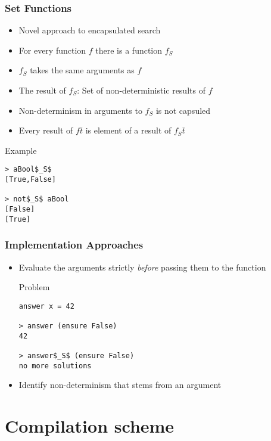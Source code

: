 \documentclass[utf8]{beamer}
\begin{document}
\begin{frame}[fragile]
\frametitle{Set Functions}
\begin{itemize}
\item Novel approach to encapsulated search
\item For every function $f$ there is a function $f_S$
\item $f_S$ takes the same arguments as $f$
\item The result of $f_S$: Set of non-deterministic results of $f$
\item Non-determinism in arguments to $f_S$ is not capsuled
\item Every result of $f \overline{t}$ is element of a
      result of $f_S \overline{t}$
\end{itemize}
\begin{block}{Example}
\begin{lstlisting}[mathescape]
> aBool$_S$ 
[True,False]

> not$_S$ aBool
[False]
[True]
\end{lstlisting}
\end{block} 
\end{frame}

\begin{frame}[fragile]
\frametitle{Implementation Approaches}
\begin{itemize}
\item Evaluate the arguments strictly \emph{before}
      passing them to the function
\pause
\begin{block}{Problem}
\begin{lstlisting}[mathescape]
answer x = 42

> answer (ensure False)
42

> answer$_S$ (ensure False)
no more solutions
\end{lstlisting}
\end{block}
\item Identify non-determinism that stems from an argument
\end{itemize}
\end{frame}

\section{Compilation scheme}
\end{document}
